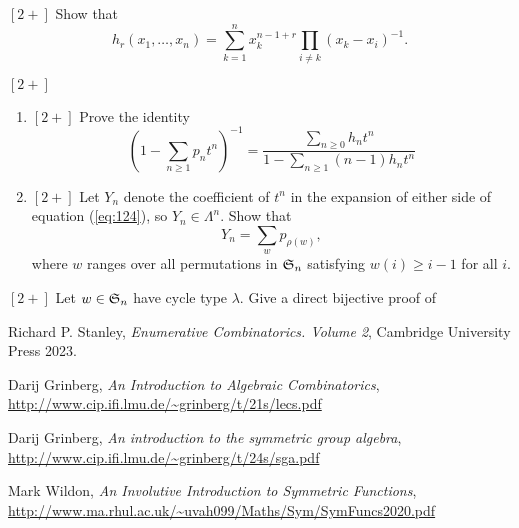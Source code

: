 \documentclass{article}
\newcommand{\frkS}{\ensuremath\mathfrak{S}}
\begin{document}
\begin{exercise}
    $[2+]$
    Show that
    \[
        h_r(x_1,\ldots,x_n) = \sum_{k=1}^n x_k^{n-1+r}\prod_{i\neq k}(x_k-x_i)^{-1}.
    \]
\end{exercise}

\begin{exercise}
    $[2+]$
    \begin{enumerate}[label=(\alph*)]
        \item $[2+]$ Prove the identity
            \begin{equation}\label{eq:124}
                \left(1-\sum_{n\geq1}p_nt^n\right)^{-1} = \frac{\sum_{n\geq0}h_nt^n}{1-\sum_{n\geq1}(n-1)h_nt^n}
            \end{equation}
        \item $[2+]$ Let $Y_n$ denote the coefficient of $t^n$ in the expansion of either side of equation (\ref{eq:124}), so $Y_n \in \Lambda^n$. Show that
            \[
                Y_n = \sum_w p_{\rho(w)},
            \]
            where $w$ ranges over all permutations in $\frkS_n$ satisfying $w(i) \geq i-1$ for all $i$.
    \end{enumerate}
\end{exercise}

\begin{exercise}
    $[2+]$
    Let $w \in \frkS_n$ have cycle type $\lambda$. Give a direct bijective proof of 
\end{exercise}


\begin{thebibliography}{999999}
    \raggedright\footnotesize

    Richard P. Stanley, \textit{Enumerative Combinatorics. Volume 2}, Cambridge University Press 2023.

    Darij Grinberg, \textit{An Introduction to Algebraic Combinatorics}, \url{http://www.cip.ifi.lmu.de/~grinberg/t/21s/lecs.pdf}

    Darij Grinberg, \textit{An introduction to the symmetric group algebra}, \url{http://www.cip.ifi.lmu.de/~grinberg/t/24s/sga.pdf}

    Mark Wildon, \textit{An Involutive Introduction to Symmetric Functions}, \url{http://www.ma.rhul.ac.uk/~uvah099/Maths/Sym/SymFuncs2020.pdf}
\end{thebibliography}
\end{document}
